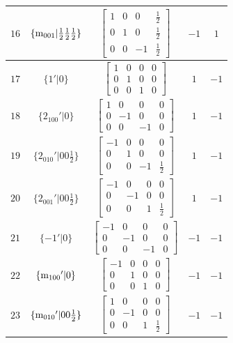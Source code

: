 \documentclass[fleqn,8pt]{jsarticle}
\begin{document}
\begin{longtable}{ccccc}
$ 16 $ & $ \{{\rm m}_{001}|\frac{1}{2} \frac{1}{2} \frac{1}{2}\} $ & $ \begin{bmatrix} 1 & 0 & 0 & \frac{1}{2} \\ 0 & 1 & 0 & \frac{1}{2} \\ 0 & 0 & -1 & \frac{1}{2} \end{bmatrix} $ & $ -1 $ & $ 1 $ \\ \hline
$ 17 $ & $ \{1{}'|0\} $ & $ \begin{bmatrix} 1 & 0 & 0 & 0 \\ 0 & 1 & 0 & 0 \\ 0 & 0 & 1 & 0 \end{bmatrix} $ & $ 1 $ & $ -1 $ \\ \hline
$ 18 $ & $ \{2{}_{100}{}'|0\} $ & $ \begin{bmatrix} 1 & 0 & 0 & 0 \\ 0 & -1 & 0 & 0 \\ 0 & 0 & -1 & 0 \end{bmatrix} $ & $ 1 $ & $ -1 $ \\ \hline
$ 19 $ & $ \{2{}_{010}{}'|0 0 \frac{1}{2}\} $ & $ \begin{bmatrix} -1 & 0 & 0 & 0 \\ 0 & 1 & 0 & 0 \\ 0 & 0 & -1 & \frac{1}{2} \end{bmatrix} $ & $ 1 $ & $ -1 $ \\ \hline
$ 20 $ & $ \{2{}_{001}{}'|0 0 \frac{1}{2}\} $ & $ \begin{bmatrix} -1 & 0 & 0 & 0 \\ 0 & -1 & 0 & 0 \\ 0 & 0 & 1 & \frac{1}{2} \end{bmatrix} $ & $ 1 $ & $ -1 $ \\ \hline
$ 21 $ & $ \{-1{}'|0\} $ & $ \begin{bmatrix} -1 & 0 & 0 & 0 \\ 0 & -1 & 0 & 0 \\ 0 & 0 & -1 & 0 \end{bmatrix} $ & $ -1 $ & $ -1 $ \\ \hline
$ 22 $ & $ \{{\rm m}_{100}{}'|0\} $ & $ \begin{bmatrix} -1 & 0 & 0 & 0 \\ 0 & 1 & 0 & 0 \\ 0 & 0 & 1 & 0 \end{bmatrix} $ & $ -1 $ & $ -1 $ \\ \hline
$ 23 $ & $ \{{\rm m}_{010}{}'|0 0 \frac{1}{2}\} $ & $ \begin{bmatrix} 1 & 0 & 0 & 0 \\ 0 & -1 & 0 & 0 \\ 0 & 0 & 1 & \frac{1}{2} \end{bmatrix} $ & $ -1 $ & $ -1 $ \\ \hline

\end{longtable}
\end{document}
